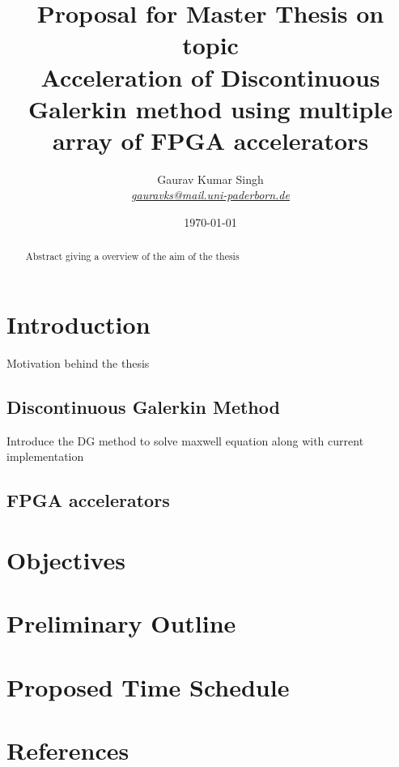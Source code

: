 \documentclass[english,notitlepage]{hgbreport}
\author{Gaurav Kumar Singh \\ \textit{\href{mailto:gauravks@mail.uni-paderborn.de}{gauravks@mail.uni-paderborn.de}}}
\title{Proposal for Master Thesis on topic \\
		Acceleration of Discontinuous Galerkin method using multiple
		array of FPGA accelerators}
\date{\today}
\begin{document}
\maketitle

\begin{abstract}\noindent
Abstract giving a overview of the aim of the thesis
\end{abstract}

\section{Introduction}

Motivation behind the thesis

\subsection{Discontinuous Galerkin Method}	%
Introduce the DG method to solve maxwell equation along with current implementation

\subsection{FPGA accelerators}
 
\section{Objectives}

\section{Preliminary Outline}

\section{Proposed Time Schedule}


  
\section*{References}

\printbibliography[heading=noheader]

\end{document}
